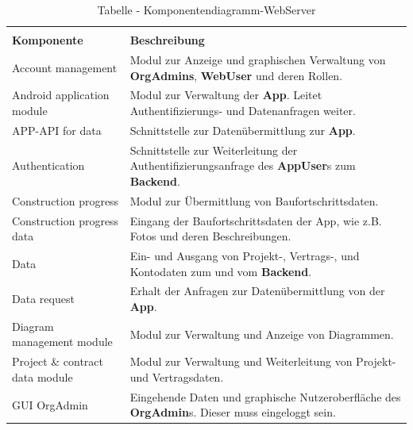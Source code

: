 \begin{longtable}[h]{p{4cm} p{10.0cm}}
	\caption{Tabelle - Komponentendiagramm-WebServer}
	\centering
	\label{tab:table_comp_webserver}
	\endlastfoot
	\multicolumn{2}{r}{{Weitergeführt auf der folgenden Seite}} \\
	\endfoot
	\endhead
	\rowcolor[HTML]{C0C0C0} 
	\textbf{Komponente} & \textbf{Beschreibung} \\
	
	Account management & Modul zur Anzeige und graphischen Verwaltung von \textbf{OrgAdmins}, \textbf{WebUser} und deren Rollen. \\
	
	\rowcolor[HTML]{E7E7E7} 
	Android application module & Modul zur Verwaltung der \textbf{App}. Leitet Authentifizierungs- und Datenanfragen weiter. \\
	
	APP-API for data & Schnittstelle zur Datenübermittlung zur \textbf{App}. \\
	
	\rowcolor[HTML]{E7E7E7} 
	Authentication & Schnittstelle zur Weiterleitung der Authentifizierungsanfrage des \textbf{AppUser}s zum \textbf{Backend}. \\
	
	Construction progress & Modul zur Übermittlung von Baufortschrittsdaten. \\
	
	\rowcolor[HTML]{E7E7E7} 
	Construction progress data & Eingang der Baufortschrittsdaten der App, wie z.B. Fotos und deren Beschreibungen. \\
	
	Data & Ein- und Ausgang von Projekt-, Vertrags-, und Kontodaten zum und vom \textbf{Backend}. \\
	
	\rowcolor[HTML]{E7E7E7} 
	Data request & Erhalt der Anfragen zur Datenübermittlung von der \textbf{App}. \\
	
	Diagram management module & Modul zur Verwaltung und Anzeige von Diagrammen. \\
	
	\rowcolor[HTML]{E7E7E7} 
	Project {\&} contract data module & Modul zur Verwaltung und Weiterleitung von Projekt- und Vertragsdaten. \\
	
	GUI OrgAdmin & Eingehende Daten und graphische Nutzeroberfläche des \textbf{OrgAdmin}s. Dieser muss eingeloggt sein. \\
	

\end{longtable}
